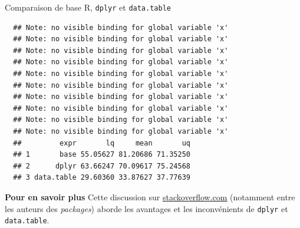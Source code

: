 \documentclass[12pt,ignorenonframetext,]{beamer}
\newenvironment{Shaded}{}{}
\newcommand{\CommentTok}[1]{\textcolor[rgb]{0.00,0.50,0.00}{#1}}
\newcommand{\DataTypeTok}[1]{#1}
\newcommand{\KeywordTok}[1]{\textcolor[rgb]{0.00,0.00,1.00}{#1}}
\newcommand{\NormalTok}[1]{#1}
\newcommand{\OperatorTok}[1]{#1}
\newcommand{\StringTok}[1]{\textcolor[rgb]{0.00,0.50,0.50}{#1}}
\renewenvironment{Shaded}{\begin{snugshade}}{\end{snugshade}}
\newcommand{\intertitre}[1]{\textcolor{redInsee}{\textbf{#1}}}
\begin{document}
\begin{frame}[fragile]{Comparaison de base R, \texttt{dplyr} et
\texttt{data.table}}
\protect\hypertarget{comparaison-de-base-r-dplyr-et-data.table}{}

\footnotesize

\begin{Shaded}
\end{Shaded}

\pause \vspace{-5mm}

\begin{verbatim}
  ## Note: no visible binding for global variable 'x' 
  ## Note: no visible binding for global variable 'x' 
  ## Note: no visible binding for global variable 'x' 
  ## Note: no visible binding for global variable 'x' 
  ## Note: no visible binding for global variable 'x' 
  ## Note: no visible binding for global variable 'x' 
  ## Note: no visible binding for global variable 'x' 
  ## Note: no visible binding for global variable 'x' 
  ## Note: no visible binding for global variable 'x' 
  ## Note: no visible binding for global variable 'x'
  ##         expr       lq     mean       uq
  ## 1       base 55.05627 81.20686 71.35250
  ## 2      dplyr 63.66247 70.09617 75.24568
  ## 3 data.table 29.60360 33.87627 37.77639
\end{verbatim}

\pause \normalsize

\intertitre{Pour en savoir plus} Cette discussion sur
\href{http://stackoverflow.com/questions/21435339/data-table-vs-dplyr-can-one-do-something-well-the-other-cant-or-does-poorly}{\underline{stackoverflow.com}}
(notamment entre les auteurs des \emph{packages}) aborde les avantages
et les inconvénients de \texttt{dplyr} et \texttt{data.table}.

\end{frame}
\end{document}
